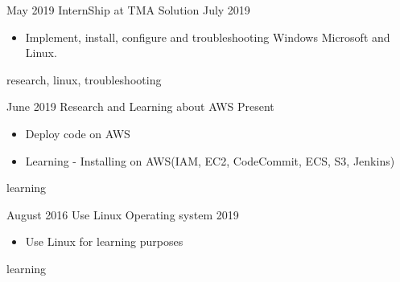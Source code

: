 

\begin{experiences}
	
	\experience%
	{May 2019}
	{InternShip at TMA Solution}{}{}
	{July 2019}
	{
		\begin{itemize}
			\item Implement, install, configure and troubleshooting Windows Microsoft and Linux.
		\end{itemize}
	}
	{research, linux, troubleshooting }
	\emptySeparator%
	
	\experience%
	{June 2019 }
	{Research and Learning about AWS }{}{}
	{Present}
	{
		\begin{itemize}
			\item Deploy code on AWS
			\item Learning - Installing on AWS(IAM, EC2, CodeCommit, ECS, S3, Jenkins)
		\end{itemize}
	}
	{learning}
	\emptySeparator%
	
	\experience%
	{August 2016}
	{Use Linux Operating system}{}{}
	{2019}
	{
		\begin{itemize}
			\item Use Linux for learning purposes
		\end{itemize}
	}
	{learning}

\end{experiences}
